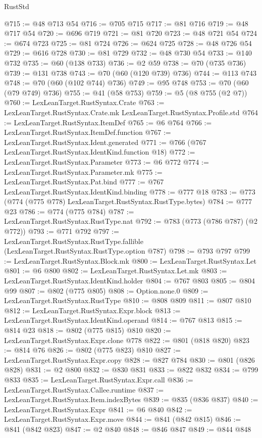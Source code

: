 \begin{lexlean}{RustStd}
\begin{coremodule}
{\begin{coremodule}
{{{{{@715 := @48 @713 @54
@716 := @705 @715
@717 := @81 @716
@719 := @48 @717 @54
@720 := @696 @719
@721 := @81 @720
@723 := @48 @721 @54
@724 := @674 @723
@725 := @81 @724
@726 := @624 @725
@728 := @48 @726 @54
@729 := @616 @728
@730 := @81 @729
@732 := @48 @730 @54
@733 := @140 @732
@735 := @60 (@138 @733)
@736 := @2 @59
@738 := @70 (@735 @736)
@739 := @131 @738
@743 := @70 (@60 (@120 @739) @736)
@744 := @113 @743
@748 := @70 (@60 (@102 @744) @736)
@749 := @95 @748
@753 := @70 (@60 (@79 @749) @736)
@755 := @41 (@58 @753)
@759 := @5 (@8 @755 (@2 @7))
@760 := LexLeanTarget.RustSyntax.Crate
@763 := LexLeanTarget.RustSyntax.Crate.mk LexLeanTarget.RustSyntax.Profile.std
@764 := LexLeanTarget.RustSyntax.ItemDef
@765 := @6 @764
@766 := LexLeanTarget.RustSyntax.ItemDef.function
@767 := LexLeanTarget.RustSyntax.Ident.generated
@771 := @766 (@767 LexLeanTarget.RustSyntax.IdentKind.function @18)
@772 := LexLeanTarget.RustSyntax.Parameter
@773 := @6 @772
@774 := LexLeanTarget.RustSyntax.Parameter.mk
@775 := LexLeanTarget.RustSyntax.Pat.bind
@777 := @767 LexLeanTarget.RustSyntax.IdentKind.binding
@778 := @777 @18
@783 := @773 (@774 (@775 @778) LexLeanTarget.RustSyntax.RustType.bytes)
@784 := @777 @23
@786 := @774 (@775 @784)
@787 := LexLeanTarget.RustSyntax.RustType.nat
@792 := @783 (@773 (@786 @787) (@2 @772))
@793 := @771 @792
@797 := LexLeanTarget.RustSyntax.RustType.fallible (LexLeanTarget.RustSyntax.RustType.option @787)
@798 := @793 @797
@799 := LexLeanTarget.RustSyntax.Block.mk
@800 := LexLeanTarget.RustSyntax.Let
@801 := @6 @800
@802 := LexLeanTarget.RustSyntax.Let.mk
@803 := LexLeanTarget.RustSyntax.IdentKind.holder
@804 := @767 @803
@805 := @804 @99
@807 := @802 (@775 @805)
@808 := Option.none.{0}
@809 := LexLeanTarget.RustSyntax.RustType
@810 := @808 @809
@811 := @807 @810
@812 := LexLeanTarget.RustSyntax.Expr.block
@813 := LexLeanTarget.RustSyntax.IdentKind.operand
@814 := @767 @813
@815 := @814 @23
@818 := @802 (@775 @815) @810
@820 := LexLeanTarget.RustSyntax.Expr.clone @778
@822 := @801 (@818 @820)
@823 := @814 @76
@826 := @802 (@775 @823) @810
@827 := LexLeanTarget.RustSyntax.Expr.copy
@828 := @827 @784
@830 := @801 (@826 @828)
@831 := @2 @800
@832 := @830 @831
@833 := @822 @832
@834 := @799 @833
@835 := LexLeanTarget.RustSyntax.Expr.call
@836 := LexLeanTarget.RustSyntax.Callee.runtime
@837 := LexLeanTarget.RustSyntax.Item.indexBytes
@839 := @835 (@836 @837)
@840 := LexLeanTarget.RustSyntax.Expr
@841 := @6 @840
@842 := LexLeanTarget.RustSyntax.Expr.move
@844 := @841 (@842 @815)
@846 := @841 (@842 @823)
@847 := @2 @840
@848 := @846 @847
@849 := @844 @848
}}}}}
\end{coremodule}}
\end{coremodule}
\end{lexlean}
